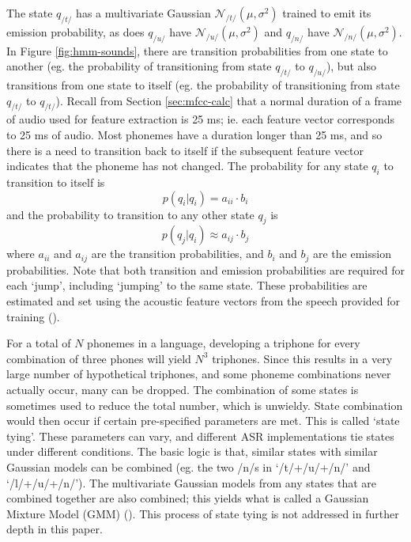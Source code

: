 The state $q_{/t/}$ has a multivariate Gaussian $\mathcal{N}_{/t/}(\mu,\sigma^2)$ trained to emit its emission probability, as does $q_{/u/}$ have $\mathcal{N}_{/u/}(\mu,\sigma^2)$ and $q_{/n/}$ have $\mathcal{N}_{/n/}(\mu,\sigma^2)$.  In Figure \ref{fig:hmm-sounds}, there are transition probabilities from one state to another (eg. the probability of transitioning from state $q_{/t/}$ to $q_{/u/}$), but also transitions from one state to itself (eg. the probability of transitioning from state $q_{/t/}$ to $q_{/t/}$).  Recall from Section \ref{sec:mfcc-calc} that a normal duration of a frame of audio used for feature extraction is 25 ms; ie. each feature vector corresponds to 25 ms of audio.  Most phonemes have a duration longer than 25 ms, and so there is a need to transition back to itself if the subsequent feature vector indicates that the phoneme has not changed.  The probability for any state $q_i$ to transition to itself is \begin{equation} p(q_i|q_i) = a_{ii}\cdot b_i \end{equation} and the probability to transition to any other state $q_j$ is \begin{equation} p(q_j|q_i) \approx a_{ij}\cdot b_j \end{equation} where $a_{ii}$ and $a_{ij}$ are the transition probabilities, and $b_i$ and $b_j$ are the emission probabilities.  Note that both transition and emission probabilities are required for each `jump', including `jumping' to the same state.  These probabilities are estimated and set using the acoustic feature vectors from the speech provided for training (\cite{gales:07}).

For a total of $N$ phonemes in a language, developing a triphone for every combination of three phones will yield $N^3$ triphones.  Since this results in a very large number of hypothetical triphones, and some phoneme combinations never actually occur, many can be dropped.  The combination of some states is sometimes used to reduce the total number, which is unwieldy.  State combination would then occur if certain pre-specified parameters are met.  This is called `state tying'. These parameters can vary, and different ASR implementations tie states under different conditions.  The basic logic is that, similar states with similar Gaussian models can be combined (eg. the two /n/s in `/t/+/u/+/n/' and `/l/+/u/+/n/').  The multivariate Gaussian models from any states that are combined together are also combined; this yields what is called a Gaussian Mixture Model (GMM) (\cite{gales:07}).  This process of state tying is not addressed in further depth in this paper.

